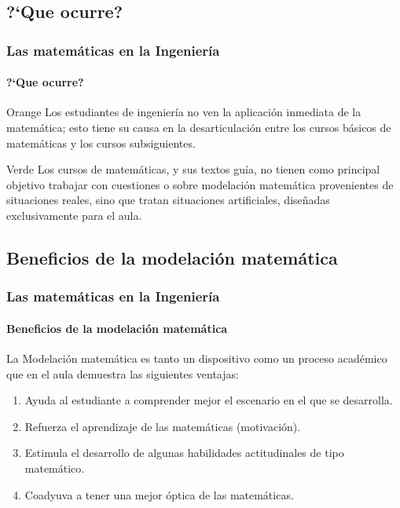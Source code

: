 \documentclass[11pt]{beamer}
\begin{document}
\subsection{?`Que ocurre?}
\begin{frame}
\frametitle{Las matemáticas en la Ingeniería}
\framesubtitle{?`Que ocurre?}
\begin{beamercolorbox}[wd={10cm},sep=1mm,rounded=true,shadow=true]{Orange}
Los estudiantes de ingeniería no ven la aplicación inmediata de la matemática;  \pause esto tiene su causa en la desarticulación entre los cursos básicos de matemáticas y los cursos subsiguientes.
\end{beamercolorbox}
\vspace{4mm}\pause

\begin{beamercolorbox}[wd={10cm},sep=1mm,rounded=true,shadow=true]{Verde}
Los cursos de matemáticas, y sus textos guía, no tienen como principal objetivo trabajar con cuestiones o sobre modelación matemática provenientes de situaciones reales, \pause sino
que tratan situaciones artificiales, diseñadas exclusivamente para el aula.
\end{beamercolorbox}
\end{frame}

\subsection{Beneficios de la modelación matemática}
\begin{frame}
\frametitle{Las matemáticas en la Ingeniería}
\framesubtitle{Beneficios de la modelación matemática}
La \textcolor{IPLAzul}{Modelación matemática} es tanto un dispositivo como un proceso académico que en el aula demuestra las siguientes ventajas:
\begin{enumerate}[<+-| alert@+>]
	\item Ayuda al estudiante a comprender mejor el escenario en el que se desarrolla.
	\item Refuerza el aprendizaje de las matemáticas (motivación).
	\item Estimula el desarrollo de algunas habilidades actitudinales de tipo matemático.
	\item Coadyuva a tener una mejor óptica de las matemáticas.
\end{enumerate}
\end{frame}

\ThankYouFrame
\end{document}
